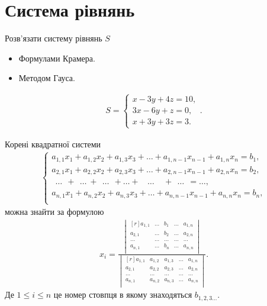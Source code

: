\section{Система рівнянь}
Розв'язати систему рівнянь \(S\)
\begin{itemize}
	\item Формулами Крамера.
	\item Методом Гауса.
\end{itemize}
\begin{gather}
	S=\begin{cases}
		x-3y+4z=10,\\
		3x-6y+z=0,\\
		x+3y+3z=3.
	\end{cases}.
\end{gather}
\begin{thm}
	\label{thm:kramer}
	Корені квадратної системи
	\begin{gather}
		\begin{cases}
			a_{1,1}x_1+ a_{1,2}x_2+ a_{1,3}x_3+ \dots + a_{1,n-1}x_{n-1}+ a_{1,n}x_n=b_1,\\ 
			a_{2,1}x_1+ a_{2,2}x_2+ a_{2,3}x_3+ \dots + a_{2,n-1}x_{n-1}+ a_{2,n}x_n=b_2,\\
			\ \ \dots\ \ + \  \ \dots  \ +\ \ \dots   \ \ + \dots +\ \  \ \ \dots \ \ \ \ \ + \ \ \dots \ \  =\dots,\\
			a_{n,1}x_1+ a_{n,2}x_2+ a_{n,3}x_3+ \dots + a_{n,n-1}x_{n-1}+ a_{n,n}x_n=b_n,\\
		\end{cases}
	\end{gather}
	можна знайти за формулою
	\begin{gather}
		x_i=\frac{\begin{vmatrix*}[r]
			a_{1,1} & \dots & b_1 & \dots & a_{1,n}\\
			a_{2,1} & \dots & b_2 & \dots & a_{2,n}\\
			\dots   & \dots & \dots & \dots & \dots\\
			a_{n,1} & \dots & b_n & \dots & a_{n,n}\\
		\end{vmatrix*}}{\begin{vmatrix*}[r]
			a_{1,1} & a_{1,2} & a_{1,3} & \dots & a_{1,n}\\
		a_{2,1} & a_{2,2} & a_{2,3} & \dots & a_{2,n}\\
		\dots   & \dots & \dots & \dots & \dots\\
		a_{n,1} & a_{n,2} & a_{n,3} & \dots & a_{n,n}\\
	\end{vmatrix*}}.
	\end{gather}
Де \(1\leq i \leq n\) це номер стовпця в якому знаходяться \(b_{1,2,3\dots}\).
\end{thm}
